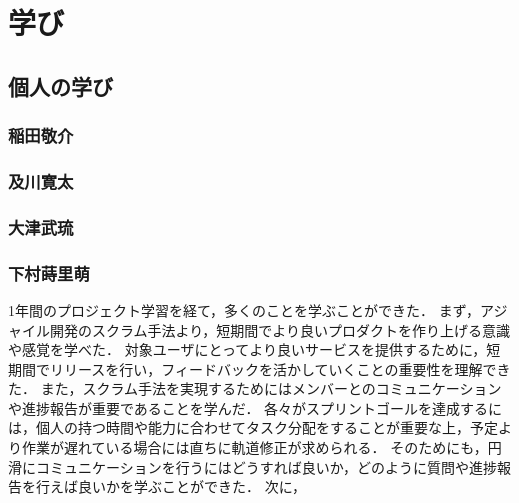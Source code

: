\chapter{学び}

\section{個人の学び}
\subsection{稲田敬介}

\subsection{及川寛太}

\subsection{大津武琉}

\subsection{下村蒔里萌}
1年間のプロジェクト学習を経て，多くのことを学ぶことができた．
まず，アジャイル開発のスクラム手法より，短期間でより良いプロダクトを作り上げる意識や感覚を学べた．
対象ユーザにとってより良いサービスを提供するために，短期間でリリースを行い，フィードバックを活かしていくことの重要性を理解できた．
また，スクラム手法を実現するためにはメンバーとのコミュニケーションや進捗報告が重要であることを学んだ．
各々がスプリントゴールを達成するには，個人の持つ時間や能力に合わせてタスク分配をすることが重要な上，予定より作業が遅れている場合には直ちに軌道修正が求められる．
そのためにも，円滑にコミュニケーションを行うにはどうすれば良いか，どのように質問や進捗報告を行えば良いかを学ぶことができた．
次に，


